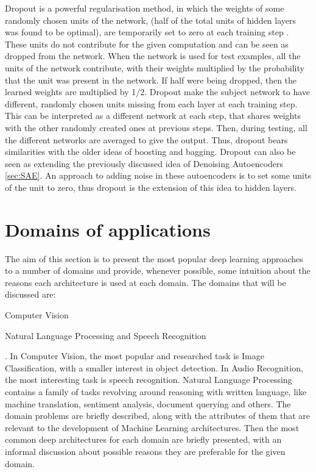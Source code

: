 \documentclass[a4paper]{article}
\begin{document}
		Dropout is a powerful regularisation method, in which the weights of some randomly chosen units of the network,  (half of the total units of hidden layers was found to be optimal), are temporarily set to zero at each training step \cite{Srivastava2014,Dahl2013}. These units do not contribute for the given computation and can be seen as dropped from the network. When the network is used for test examples, all the units of the network contribute, with their weights multiplied by the probability that the unit was present in the network. If half were being dropped, then the learned weights are multiplied by 1/2.
		Dropout make the subject network to have different, randomly chosen units missing from each layer at each training step. This can be interpreted as a different network at each step, that shares weights with the other randomly created ones at previous steps. Then, during testing, all the different networks are averaged to give the output. Thus, dropout bears similarities with the older ideas of boosting and bagging. Dropout can also be seen as extending the previously discussed idea of Denoising Autoencoders \ref{sec:SAE}. An approach to adding noise in these autoencoders is to set some units of the unit to zero, thus dropout is the extension of this idea to hidden layers.	
\section{Domains of applications}
\label{sec:Domains}
	The aim of this section is to present the most popular deep learning approaches to a number of domains and provide, whenever possible, some intuition about the reasons each architecture is used at each domain. The domains that will be discussed are:
	\begin{enumerate*}
		\item Computer Vision
		\item Natural Language Processing and Speech Recognition
	\end{enumerate*}.	
	In Computer Vision, the most popular and researched task is Image Classification, with a smaller interest in object detection. In Audio Recognition, the most interesting task is speech recognition. Natural Language Processing contains a family of tasks revolving around reasoning with written language, like machine translation, sentiment analysis, document querying and others. 
	The domain problems are briefly described, along with the attributes of them that are relevant to the development of Machine Learning architectures. Then the most common deep architectures for each domain are briefly presented, with an informal discussion about possible reasons they are preferable for the given domain. 
\end{document}
